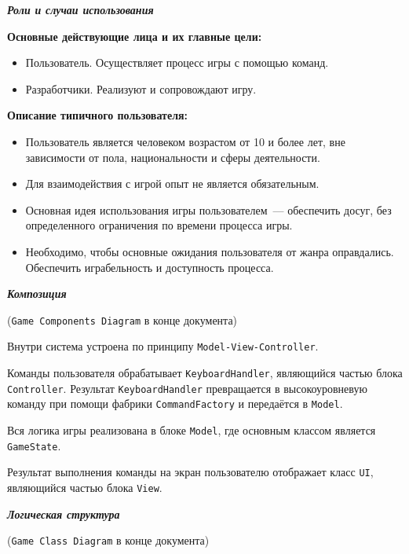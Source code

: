 \documentclass[12pt]{article}
\begin{document}
\begin{center}
\vspace*{0.1cm}
{\Large \textit{\textbf{Роли и случаи использования}}}
\end{center}

\textbf{Основные действующие лица и их главные цели:}

\begin{itemize}
\item Пользователь. Осуществляет процесс игры с помощью команд.
\item Разработчики. Реализуют и сопровождают игру. 
\end{itemize}

\textbf{Описание типичного пользователя:}

\begin{itemize}
\item Пользователь является человеком возрастом от 10 и более лет, вне зависимости от пола, национальности и сферы деятельности. 
\item Для взаимодействия с игрой опыт не является обязательным. 
\item Основная идея использования игры пользователем~--- обеспечить досуг, без определенного ограничения по времени процесса игры.
\item Необходимо, чтобы основные ожидания пользователя от жанра оправдались. Обеспечить играбельность и доступность процесса.
\end{itemize}

\begin{center}
\vspace*{0.1cm}
{\Large \textit{\textbf{Композиция}}}

(\texttt{Game Components Diagram} в конце документа)
\end{center}

Внутри система устроена по принципу \texttt{Model-View-Controller}.

Команды пользователя обрабатывает \texttt{KeyboardHandler}, являющийся частью блока \texttt{Controller}. Результат \texttt{KeyboardHandler} превращается в высокоуровневую команду при помощи фабрики \texttt{CommandFactory} и передаётся в \texttt{Model}.

Вся логика игры реализована в блоке \texttt{Model}, где основным классом является \texttt{GameState}.

Результат выполнения команды на экран пользователю отображает класс \texttt{UI}, являющийся частью блока \texttt{View}.

\begin{center}
\vspace*{0.1cm}
{\Large \textit{\textbf{Логическая структура}}}

(\texttt{Game Class Diagram} в конце документа)
\end{center}
\end{document}
